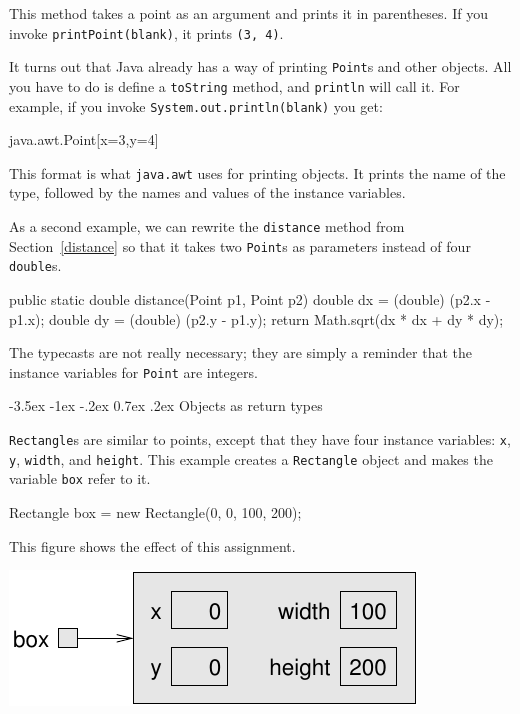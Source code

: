 \documentclass[12pt]{book}
\makeatletter
\theoremstyle{exercise}
\newcommand{\java}[1]{\verb"#1"}
\renewcommand{\section}{\@startsection {section}{1}{\z@}%
    {-3.5ex \@plus -1ex \@minus -.2ex}%
    {0.7ex \@plus.2ex}%
    {\normalfont\Large\bfseries}}
\newcommand{\java}[1]{\lstinline{#1}} %
\makeatother
\begin{document}
This method takes a point as an argument and prints it in parentheses.
If you invoke \java{printPoint(blank)}, it prints \java{(3, 4)}.

It turns out that Java already has a way of printing \java{Point}s and other objects.
All you have to do is define a \java{toString} method, and \java{println} will call it.
For example, if you invoke \java{System.out.println(blank)} you get:

\begin{stdout}
java.awt.Point[x=3,y=4]
\end{stdout}

This format is what \java{java.awt} uses for printing objects.
It prints the name of the type, followed by the names and values of the instance variables.

As a second example, we can rewrite the \java{distance} method from Section~\ref{distance} so that it takes two \java{Point}s as parameters instead of four \java{double}s.

\begin{code}
    public static double distance(Point p1, Point p2) {
        double dx = (double) (p2.x - p1.x);
        double dy = (double) (p2.y - p1.y);
        return Math.sqrt(dx * dx + dy * dy);
    }
\end{code}

The typecasts are not really necessary; they are simply a reminder that the instance variables for \java{Point} are integers.


\section{Objects as return types}


\java{Rectangle}s are similar to points, except that they have four instance variables: \java{x}, \java{y}, \java{width}, and \java{height}.
This example creates a \java{Rectangle} object and makes the variable \java{box} refer to it.

\begin{code}
    Rectangle box = new Rectangle(0, 0, 100, 200);
\end{code}

This figure shows the effect of this assignment.

\begin{center}
\includegraphics{figs/rectangle.pdf}
\end{center}
\end{document}
